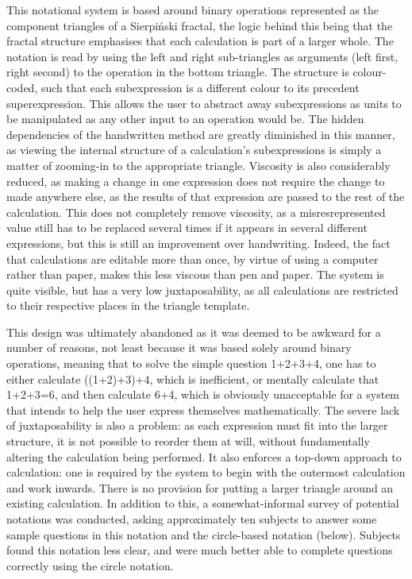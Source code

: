 \documentclass[12pt,twoside,notitlepage,xetex]{report}
\begin{document}
This notational system is based around binary operations represented as the
component triangles of a Sierpiński fractal, the logic behind this being that
the fractal structure emphasises that each calculation is part of a larger
whole.  The notation is read by using the left and right sub-triangles as
arguments (left first, right second) to the operation in the bottom triangle.
The structure is colour-coded, such that each subexpression is a different
colour to its precedent superexpression.  This allows the user to abstract away
subexpressions as units to be manipulated as any other input to an operation
would be.  The hidden dependencies of the handwritten method are greatly
diminished in this manner, as viewing the internal structure of a
calculation's subexpressions is simply a matter of zooming-in to the
appropriate triangle.  Viscosity is also considerably reduced, as making a
change in one expression does not require the change to made anywhere else, as
the results of that expression are passed to the rest of the calculation.  This
does not completely remove viscosity, as a misresrepresented value still has to
be replaced several times if it appears in several different expressions, but
this is still an improvement over handwriting.  Indeed, the fact that
calculations are editable more than once, by virtue of using a computer rather
than paper, makes this less viscous than pen and paper.  The system is quite
visible, but has a very low juxtaposability, as all calculations are restricted
to their respective places in the triangle template.

This design was ultimately abandoned as it was deemed to be awkward for a
number of reasons, not least because it was based solely around binary
operations, meaning that to solve the simple question 1+2+3+4, one has to either
calculate ((1+2)+3)+4, which is inefficient, or mentally calculate that
1+2+3=6, and then calculate 6+4, which is obviously unacceptable for a system
that intends to help the user express themselves mathematically.  The severe
lack of juxtaposability is also a problem: as each expression must fit into the
larger structure, it is not possible to reorder them at will, without
fundamentally altering the calculation being performed.  It also enforces a
top-down approach to calculation: one is required by the system to begin with the
outermost calculation and work inwards.  There is no provision for putting a
larger triangle around an existing calculation.  In addition to this, a
somewhat-informal survey of potential notations was conducted, asking
approximately ten subjects to answer some sample questions in this notation and
the circle-based notation (below).  Subjects found this notation less clear,
and were much better able to complete questions correctly using the circle
notation.
\end{document}
